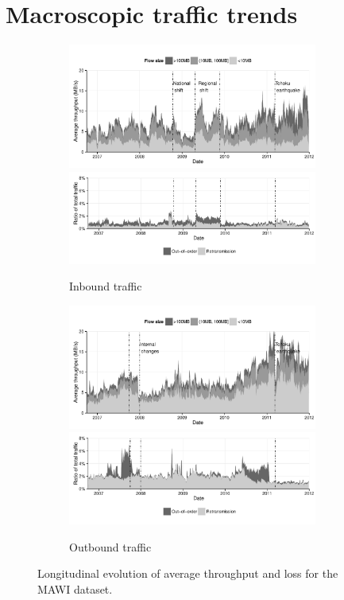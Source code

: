\section{Macroscopic traffic trends}
\label{section:malawi:macro}

\begin{figure}
  \centering
  \begin{subfigure}[b]{1.0\linewidth}
  \includegraphics[width=0.9\textwidth]{figures/malawi/tputout}\\
  \includegraphics[width=0.9\textwidth]{figures/malawi/lossesout}
  \caption{Inbound traffic\label{fig:MAWIin}}
  \end{subfigure}
  \begin{subfigure}[b]{1.0\linewidth}
  \includegraphics[width=0.9\textwidth]{figures/malawi/tputin}\\
  \includegraphics[width=0.9\textwidth]{figures/malawi/lossesin}
  \caption{Outbound traffic\label{fig:MAWIout}}
  \end{subfigure}
  \caption{Longitudinal evolution of average throughput and loss for the \acs{MAWI} dataset.}\label{fig:MAWI}
\end{figure}

